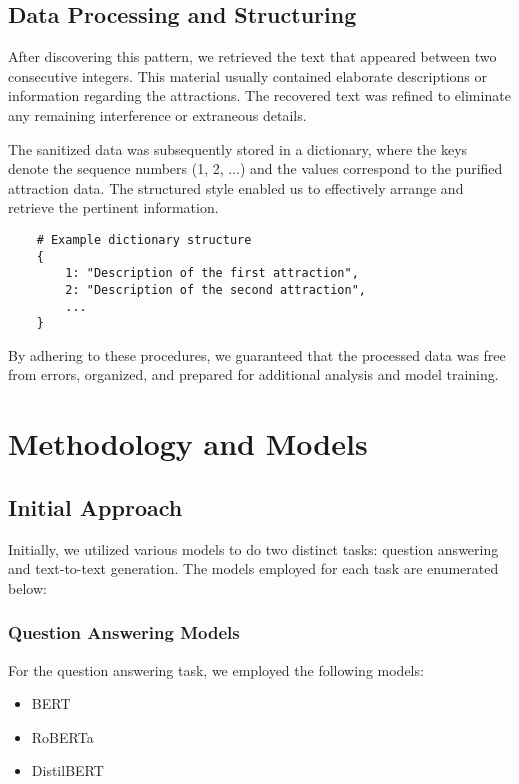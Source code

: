 \documentclass[conference]{IEEEtran}
\begin{document}
    \subsection{Data Processing and Structuring}
    After discovering this pattern, we retrieved the text that appeared between two consecutive integers. This material usually contained elaborate descriptions or information regarding the attractions. The recovered text was refined to eliminate any remaining interference or extraneous details.

    The sanitized data was subsequently stored in a dictionary, where the keys denote the sequence numbers (1, 2, ...) and the values correspond to the purified attraction data. The structured style enabled us to effectively arrange and retrieve the pertinent information.

    \begin{verbatim}
    # Example dictionary structure
    {
        1: "Description of the first attraction",
        2: "Description of the second attraction",
        ...
    }
    \end{verbatim}

    By adhering to these procedures, we guaranteed that the processed data was free from errors, organized, and prepared for additional analysis and model training.

\section{Methodology and Models}

    \subsection{Initial Approach}

        Initially, we utilized various models to do two distinct tasks: question answering and text-to-text generation. The models employed for each task are enumerated below:

        \subsubsection{Question Answering Models}

        For the question answering task, we employed the following models:
        \begin{itemize}
            \item BERT
            \item RoBERTa
            \item DistilBERT
        \end{itemize}
\end{document}
